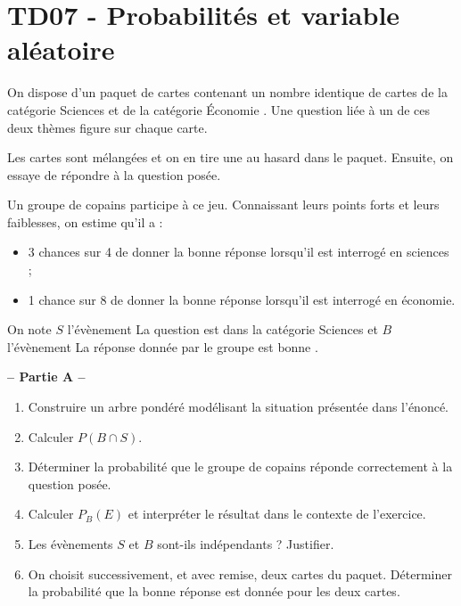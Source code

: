 \documentclass[a4paper,11pt]{article}
\author{Pierquet}
\title{\nomfichier}
\begin{document}
\pagestyle{fancy}

\part{TD07 - Probabilités et variable aléatoire}

\smallskip

%

On dispose d'un paquet de cartes contenant un nombre identique de cartes de la catégorie \og Sciences \fg{} et de la catégorie \og Économie \fg. Une question liée à un de ces deux thèmes figure sur chaque carte.

Les cartes sont mélangées et on en tire une au hasard dans le paquet. Ensuite, on essaye de répondre à la question posée.

\smallskip

Un groupe de copains participe à ce jeu. Connaissant leurs points forts et leurs faiblesses, on estime qu'il a :

\begin{itemize}
	\item 3 chances sur 4 de donner la bonne réponse lorsqu'il est interrogé en sciences ;
	\item 1 chance sur 8 de donner la bonne réponse lorsqu'il est interrogé en économie.
\end{itemize}

On note $S$ l'évènement \og La question est dans la catégorie Sciences \fg{} et $B$ l'évènement \og La réponse donnée par le groupe est bonne \fg.

\bigskip

\textbf{-- Partie A --}
%
\begin{enumerate}
	\item Construire un arbre pondéré modélisant la situation présentée dans l'énoncé.
	\item Calculer $P(B \cap S)$.
	\item Déterminer la probabilité que le groupe de copains réponde correctement à la question posée.
	\item Calculer $P_B(E)$ et interpréter le résultat dans le contexte de l'exercice.
	\item Les évènements $S$ et $B$ sont-ils indépendants ? Justifier.
	\item On choisit successivement, et avec remise, deux cartes du paquet. Déterminer la probabilité que la bonne réponse est donnée pour les deux cartes.
\end{enumerate}
\end{document}
